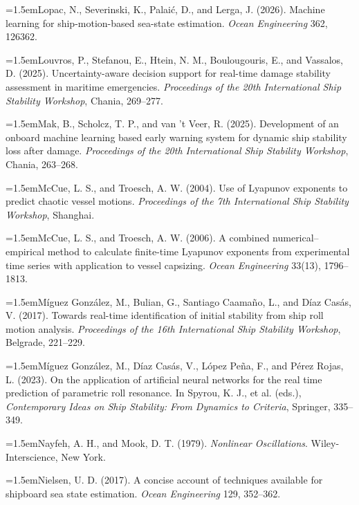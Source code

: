 \documentclass[11pt]{article}
\begin{document}
\hangindent=1.5em\noindent Lopac, N., Severinski, K., Palai\'c, D., and Lerga, J. (2026). Machine learning for ship-motion-based sea-state estimation. \emph{Ocean Engineering} 362, 126362.\par
\hangindent=1.5em\noindent Louvros, P., Stefanou, E., Htein, N. M., Boulougouris, E., and Vassalos, D. (2025). Uncertainty-aware decision support for real-time damage stability assessment in maritime emergencies. \emph{Proceedings of the 20th International Ship Stability Workshop}, Chania, 269--277.\par
\hangindent=1.5em\noindent Mak, B., Scholcz, T. P., and van 't Veer, R. (2025). Development of an onboard machine learning based early warning system for dynamic ship stability loss after damage. \emph{Proceedings of the 20th International Ship Stability Workshop}, Chania, 263--268.\par
\hangindent=1.5em\noindent McCue, L. S., and Troesch, A. W. (2004). Use of Lyapunov exponents to predict chaotic vessel motions. \emph{Proceedings of the 7th International Ship Stability Workshop}, Shanghai.\par
\hangindent=1.5em\noindent McCue, L. S., and Troesch, A. W. (2006). A combined numerical--empirical method to calculate finite-time Lyapunov exponents from experimental time series with application to vessel capsizing. \emph{Ocean Engineering} 33(13), 1796--1813.\par
\hangindent=1.5em\noindent M\'iguez Gonz\'alez, M., Bulian, G., Santiago Caama\~no, L., and D\'iaz Cas\'as, V. (2017). Towards real-time identification of initial stability from ship roll motion analysis. \emph{Proceedings of the 16th International Ship Stability Workshop}, Belgrade, 221--229.\par
\hangindent=1.5em\noindent M\'iguez Gonz\'alez, M., D\'iaz Cas\'as, V., L\'opez Pe\~na, F., and P\'erez Rojas, L. (2023). On the application of artificial neural networks for the real time prediction of parametric roll resonance. In Spyrou, K. J., et al. (eds.), \emph{Contemporary Ideas on Ship Stability: From Dynamics to Criteria}, Springer, 335--349.\par
\hangindent=1.5em\noindent Nayfeh, A. H., and Mook, D. T. (1979). \emph{Nonlinear Oscillations}. Wiley-Interscience, New York.\par
\hangindent=1.5em\noindent Nielsen, U. D. (2017). A concise account of techniques available for shipboard sea state estimation. \emph{Ocean Engineering} 129, 352--362.\par
\end{document}
